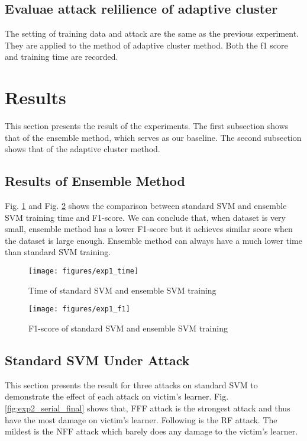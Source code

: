 \documentclass[10pt,conference,compsocconf,letterpaper]{IEEEtran}
\begin{document}
\subsection{Evaluae attack relilience of adaptive cluster}
The setting of training data and attack are the same as the previous experiment. They are applied to the method of adaptive cluster method. Both the f1 score and training time are recorded.


\section{Results}

This section presents the result of the experiments. The first subsection shows that of the ensemble method, which serves as our baseline. The second subsection shows that of the adaptive cluster method.

\subsection{Results of Ensemble Method}
Fig. \ref{fig:ensemble_time} and Fig. \ref{fig:ensemble_f1} shows the comparison between standard SVM and ensemble SVM training time and F1-score. We can conclude that, when dataset is very small, ensemble method has a lower F1-score but it achieves similar score when the dataset is large enough. Ensemble method can always have a much lower time than standard SVM training.
\begin{figure}[h]
  \centering
  \label{fig:ensemble_time}
  \texttt{[image: figures/exp1\_time]}
  \caption{Time of standard SVM and ensemble SVM training}
\end{figure}

\begin{figure}[h]
  \centering
  \label{fig:ensemble_f1}
	  \texttt{[image: figures/exp1\_f1]}
  \caption{F1-score of standard SVM and ensemble SVM training}
\end{figure}

\subsection{Standard SVM Under Attack}
This section presents the result for three attacks on standard SVM to demonstrate the effect of each attack on victim's learner. Fig. \ref{fig:exp2_serial_final} shows that, FFF attack is the strongest attack and thus have the most damage on victim's learner. Following is the RF attack. The mildest is the NFF attack which barely does any damage to the victim's learner.
\end{document}
